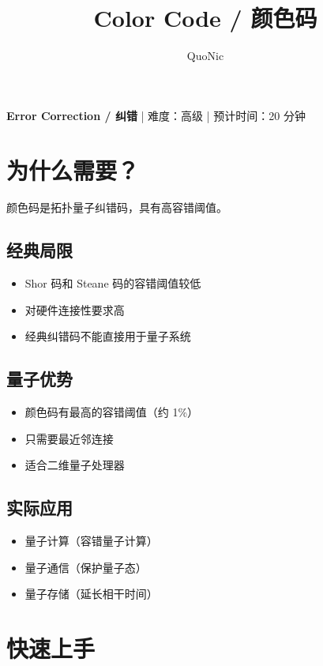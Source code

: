 \documentclass[12pt,a4paper]{article}
\title{Color Code / 颜色码}
\author{QuoNic}
\date{}
\begin{document}
\maketitle

\begin{center}
\textbf{Error Correction / 纠错} | 难度：高级 | 预计时间：20 分钟
\end{center}

\tableofcontents
\newpage

\section{为什么需要？}

颜色码是拓扑量子纠错码，具有高容错阈值。

\subsection{经典局限}
\begin{itemize}
  \item Shor 码和 Steane 码的容错阈值较低
  \item 对硬件连接性要求高
  \item 经典纠错码不能直接用于量子系统
\end{itemize}

\subsection{量子优势}
\begin{itemize}
  \item 颜色码有最高的容错阈值（约 1\%）
  \item 只需要最近邻连接
  \item 适合二维量子处理器
\end{itemize}

\subsection{实际应用}
\begin{itemize}
  \item 量子计算（容错量子计算）
  \item 量子通信（保护量子态）
  \item 量子存储（延长相干时间）
\end{itemize}

\section{快速上手}
\end{document}
